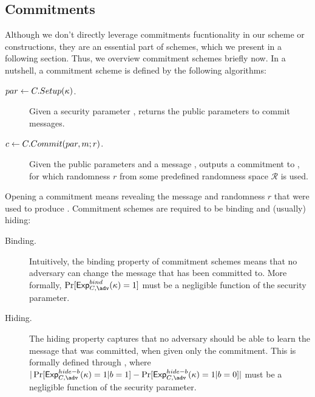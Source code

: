 \subsection{Commitments}
\label{sapp:commitments}

Although we don't directly leverage commitments fucntionality in our \UAS scheme
or constructions, they are an essential part of \SBCM schemes, which we present
in a following section. Thus, we overview commitment schemes briefly now. In a
nutshell, a commitment scheme is defined by the following algorithms:

\begin{description}
\item[$par \gets C.Setup(\kappa)$.] Given a security parameter \secpar,
  returns the public parameters \parm to commit messages.
\item[$c \gets C.Commit(par,m;r)$.] Given the public parameters and
  a message \msg, outputs a commitment \com to \msg, for which randomness $r$
  from some predefined randomness space $\mathcal{R}$ is used.
\end{description}

Opening a commitment \Ccom means revealing the message \msg and randomness $r$
that were used to produce \Ccom. Commitment schemes are required to be binding
and (usually) hiding:

\begin{description}
\item[Binding.] Intuitively, the binding property of commitment schemes means
  that no adversary can change the message that has been committed to. More
  formally, $\Pr[\ExpComBind(\secpar) = 1]$ must be a negligible function of
  the security parameter.
\item[Hiding.] The hiding property captures that no adversary should be able to
  learn the message that was committed, when given only the commitment. This is
  formally defined through \ExpComHideb, where $|\Pr[\ExpComHideb(\secpar)=1|
  b=1] - \Pr[\ExpComHideb(\secpar)=1|b=0]|$ must be a negligible function of
  the security parameter.
\end{description}


